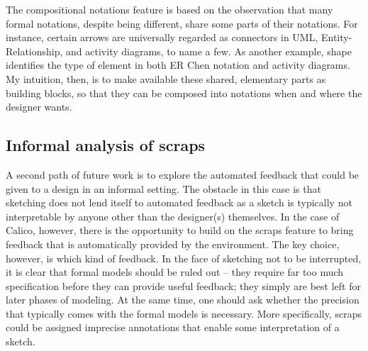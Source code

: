 \documentclass[12pt,fleqn]{ucithesis}
\begin{document}
The compositional notations feature is based on the observation that many formal notations, despite being different, share some parts of their notations. For instance, certain arrows are universally regarded as connectors in UML, Entity-Relationship, and activity diagrams, to name a few. As another example, shape identifies the type of element in both ER Chen notation and activity diagrams. My intuition, then, is to make available these shared, elementary parts as building blocks, so that they can be composed into
notations when and where the designer wants. 

%
%

\subsection{Informal analysis of scraps}
%
%
%
%
A second path of future work is to explore the automated feedback that could be given to a design in an informal setting. The obstacle in this case is that sketching does not lend itself to automated feedback as a sketch is typically not interpretable by anyone other than the designer(s) themselves. In the case of Calico, however, there is the opportunity to build on the scraps feature to bring feedback that is automatically provided by the environment. The key choice, however, is which kind of feedback. In the face of sketching not to be interrupted, it is clear that formal models should be ruled out -- they require far too much specification before they can provide useful feedback; they simply are best left for later phases of modeling. At the same time, one should ask whether the precision that typically comes with the formal models is necessary. More specifically, scraps could be assigned imprecise annotations that enable some interpretation of a sketch.
\end{document}
